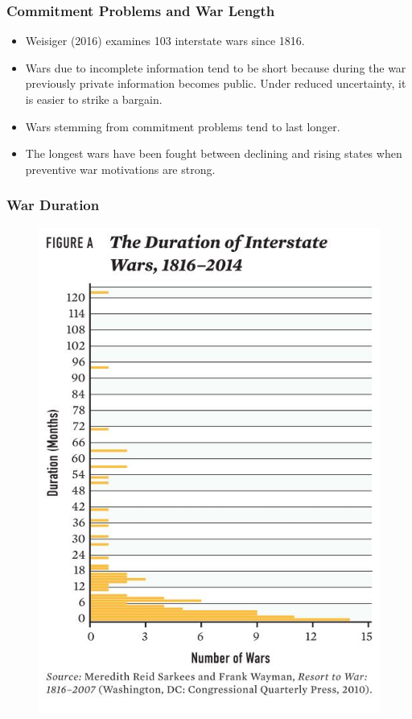 \documentclass[handout]{beamer}
\begin{document}
\begin{frame} 
	\frametitle{\LARGE{Commitment Problems and War Length}}
	\begin{itemize}
		\item Weisiger (2016) examines 103 interstate wars since 1816. \pause
		\item Wars due to incomplete information tend to be short because during the war previously private information becomes public. Under reduced uncertainty, it is easier to strike a bargain. \pause
		\item Wars stemming from commitment problems tend to last longer. \pause
		\item The longest wars have been fought between declining and rising states when preventive war motivations are strong.  
	\end{itemize}
\end{frame}

\begin{frame} 
	\frametitle{\LARGE{War Duration}}
	\begin{figure}[ht!]
		\centering
		\includegraphics[width=\textwidth,height=0.8\textheight,keepaspectratio]{war duration.JPG}
	\end{figure}
\end{frame}
\end{document}
